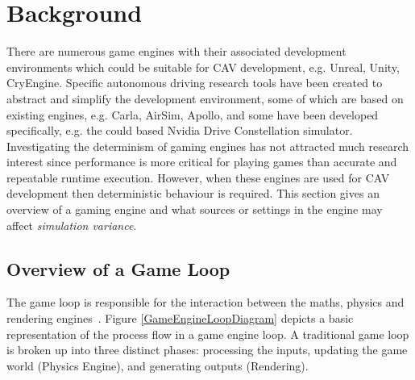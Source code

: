






\section{Background} \label{s:background}

There are numerous game engines with their associated development environments which could be suitable for CAV development, e.g. Unreal, Unity, CryEngine. Specific autonomous driving research tools have been created to abstract and simplify the development environment, some of which are based on existing engines, e.g. Carla, AirSim, Apollo, and some have been developed specifically, e.g. the could based Nvidia Drive Constellation simulator. 
%
Investigating the determinism of gaming engines has not attracted much research interest since performance is more critical for playing games than accurate and repeatable runtime execution. However, when these engines are used for CAV development then deterministic behaviour is required. This section gives an overview of a gaming engine and what sources or settings in the engine may affect \textit{simulation variance}.
%

\subsection{Overview of a Game Loop} \label{GameLoopSection}
The game loop is responsible for the interaction between the maths, physics and rendering engines~\cite{GameEngineArchBook}. Figure \ref{GameEngineLoopDiagram} depicts a basic representation of the process flow in a game engine loop. A traditional  game loop is broken up into three distinct phases: processing the inputs, updating the game world (Physics Engine), and generating outputs (Rendering).

